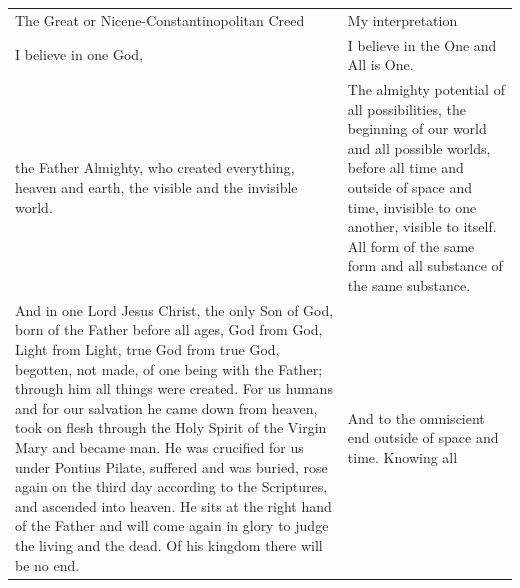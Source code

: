 \documentclass[
  ngerman,
]{article}
\begin{document}
\begin{longtable}[]{@{}
  >{\raggedright\arraybackslash}p{}
  >{\raggedright\arraybackslash}p{}@{}}
\toprule\noalign{}
\begin{minipage}[b]{\linewidth}\raggedright
The Great or Nicene-Constantinopolitan Creed
\end{minipage} & \begin{minipage}[b]{\linewidth}\raggedright
My interpretation
\end{minipage} \\
\begin{minipage}[b]{\linewidth}\raggedright
I believe in one God,
\end{minipage} & \begin{minipage}[b]{\linewidth}\raggedright
I believe in the One and All is One.
\end{minipage} \\
\begin{minipage}[b]{\linewidth}\raggedright
the Father Almighty, who created everything, heaven and earth, the
visible and the invisible world.
\end{minipage} & \begin{minipage}[b]{\linewidth}\raggedright
The almighty potential of all possibilities, the beginning of our world
and all possible worlds, before all time and outside of space and time,
invisible to one another, visible to itself. All form of the same form
and all substance of the same substance.
\end{minipage} \\
\begin{minipage}[b]{\linewidth}\raggedright
And in one Lord Jesus Christ, the only Son of God, born of the Father
before all ages, God from God, Light from Light, true God from true God,
begotten, not made, of one being with the Father; through him all things
were created. For us humans and for our salvation he came down from
heaven, took on flesh through the Holy Spirit of the Virgin Mary and
became man. He was crucified for us under Pontius Pilate, suffered and
was buried, rose again on the third day according to the Scriptures, and
ascended into heaven. He sits at the right hand of the Father and will
come again in glory to judge the living and the dead. Of his kingdom
there will be no end.
\end{minipage} & \begin{minipage}[b]{\linewidth}\raggedright
And to the omniscient end outside of space and time. Knowing all

\end{minipage}
\end{longtable}
\end{document}
